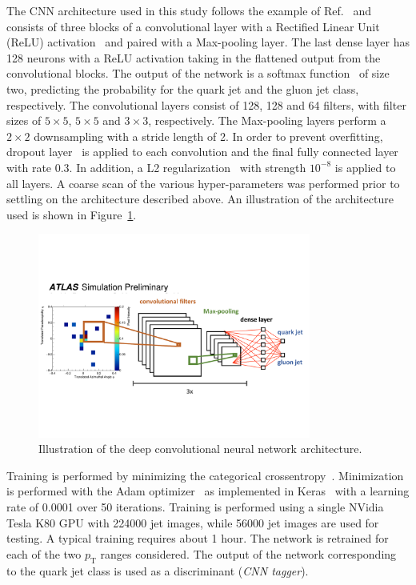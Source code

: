 The CNN architecture used in this study follows the example of Ref.~\cite{Komiske:2016rsd} and consists of three blocks of a convolutional layer with a
Rectified Linear Unit (ReLU) activation~\cite{RELU} and paired with a Max-pooling layer.
The last dense layer has 128 neurons with a ReLU activation taking in the flattened output from the convolutional blocks.
The output of the network is a softmax function~\cite{dlbook} of size two, 
predicting the probability for the quark jet and the gluon jet class, respectively. 
The convolutional layers consist of 128, 128 and 64 filters, with filter sizes of $5\times5$, $5\times5$ and $3\times3$, respectively.
The Max-pooling layers perform a $2\times2$ downsampling with a stride length of 2.
In order to prevent overfitting, dropout layer~\cite{Goodfellow-et-al-2016-Book} is applied to each convolution and the final fully connected layer with rate 0.3.
In addition, a L2 regularization~\cite{Goodfellow-et-al-2016-Book} with strength $10^{-8}$ is applied to all layers.  
A coarse scan of the various hyper-parameters was performed prior to settling on the architecture described above.
An illustration of the architecture used is shown in Figure~\ref{fig:networkarch}.

\begin{figure}[htpb]
\begin{center}
\includegraphics[width=0.8\textwidth]{figures/CNN/network.pdf}
\caption{Illustration of the deep convolutional neural network architecture.}
\label{fig:networkarch}
\end{center}
\end{figure}

Training is performed by minimizing the categorical crossentropy~\cite{Goodfellow-et-al-2016-Book}.
Minimization is performed with the Adam optimizer~\cite{DBLP:journals/corr/KingmaB14} 
as implemented in Keras~\cite{keras}
with a learning rate of 0.0001 over 50 iterations.
Training is performed using a single NVidia Tesla K80 GPU with 224000 jet images, while 56000 jet images are used for testing.
A typical training requires about 1 hour.
The network is retrained for each of the two $p_\text{T}$ ranges considered.
The output of the network corresponding to the quark jet class is used as a discriminant (\textit{CNN tagger}).
